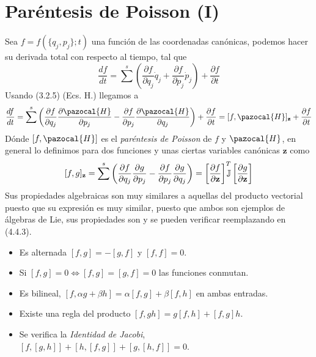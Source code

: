 \section{Paréntesis de Poisson (I)} 
Sea $f=f(\{q_j,p_j\};t)$ una función de las coordenadas canónicas, podemos hacer su derivada total con respecto al tiempo, tal que
\begin{equation} \label{4.4.1}
    \frac{d f}{dt} = \sum^s \left(\frac{\partial f}{\partial q_j}\dot{q}_j+\frac{\partial f}{\partial p_j}\dot{p}_j\right) + \frac{\partial f}{\partial t}
\end{equation} 
Usando (3.2.5) (Ecs. H.) llegamos a 
\begin{equation} \label{4.4.2}
\frac{d f}{dt} = \sum^s \left(\frac{\partial f}{\partial q_j}\frac{\partial \pazocal{H}}{\partial p_j}-\frac{\partial f}{\partial p_j}\frac{\partial \pazocal{H}}{\partial q_j}\right) + \frac{\partial f}{\partial t} = [f,\pazocal{H}]_\mathbf{z} + \frac{\partial f}{\partial t}
\end{equation} 
Dónde $[f,\pazocal{H}]$ es el \textit{paréntesis de Poisson} de $f$ y $\pazocal{H}$, en general lo definimos para dos funciones y unas ciertas variables canónicas $\mathbf{z}$ como
\begin{equation} \label{4.4.3}
    [f,g]_\mathbf{z}=  \sum^s \left(\frac{\partial f}{\partial q_j}\frac{\partial g}{\partial p_j}-\frac{\partial f}{\partial p_j}\frac{\partial g}{\partial q_j}\right) = \left[\frac{\partial f}{\partial \mathbf{z}}\right]^T \hspace{-7pt} \mathbb{J} \left[\frac{\partial g}{\partial \mathbf{z}}\right]
\end{equation} 
Sus propiedades algebraicas son muy similares a aquellas del producto vectorial puesto que su expresión es muy similar, puesto que ambos son ejemplos de álgebras de Lie, sus propiedades son y se pueden verificar reemplazando en (4.4.3).
\begin{itemize}
    \item Es alternada $[f,g]=-[g,f]$ y $[f,f]=0$.
    \item Si $[f,g]=0 \iff [f,g]=[g,f]=0$ las funciones conmutan.
    \item Es bilineal, $[f,\alpha g + \beta h] = \alpha [f,g] + \beta [f,h]$ en ambas entradas.
    \item Existe una regla del producto $[f,gh]=g[f,h]+[f,g]h$.
    \item Se verifica la \textit{Identidad de Jacobi}, $\left[f,[g,h]\right]+\left[h,[f,g]\right]+\left[g,[h,f]\right]=0$.
\end{itemize}

